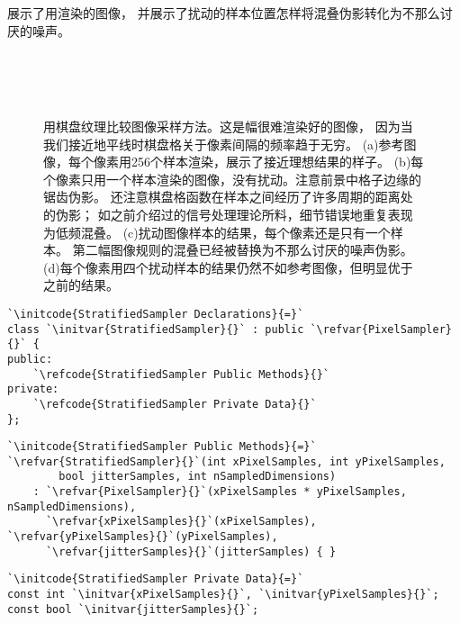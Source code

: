展示了用渲染的图像，
并展示了扰动的样本位置怎样将混叠伪影转化为不那么讨厌的噪声。
\begin{figure}[htbp]
    \centering
    \\
    \\
    \\
    \caption{用棋盘纹理比较图像采样方法。这是幅很难渲染好的图像，
        因为当我们接近地平线时棋盘格关于像素间隔的频率趋于无穷。
        (a)参考图像，每个像素用256个样本渲染，展示了接近理想结果的样子。
        (b)每个像素只用一个样本渲染的图像，没有扰动。注意前景中格子边缘的锯齿伪影。
        还注意棋盘格函数在样本之间经历了许多周期的距离处的伪影；
        如之前介绍过的信号处理理论所料，细节错误地重复表现为低频混叠。
        (c)扰动图像样本的结果，每个像素还是只有一个样本。
        第二幅图像规则的混叠已经被替换为不那么讨厌的噪声伪影。
        (d)每个像素用四个扰动样本的结果仍然不如参考图像，但明显优于之前的结果。}
    \label{fig:7.19}
\end{figure}

\begin{lstlisting}
`\initcode{StratifiedSampler Declarations}{=}`
class `\initvar{StratifiedSampler}{}` : public `\refvar{PixelSampler}{}` {
public:
    `\refcode{StratifiedSampler Public Methods}{}`
private:
    `\refcode{StratifiedSampler Private Data}{}`
};
\end{lstlisting}
\begin{lstlisting}
`\initcode{StratifiedSampler Public Methods}{=}`
`\refvar{StratifiedSampler}{}`(int xPixelSamples, int yPixelSamples,
        bool jitterSamples, int nSampledDimensions)
    : `\refvar{PixelSampler}{}`(xPixelSamples * yPixelSamples, nSampledDimensions),
      `\refvar{xPixelSamples}{}`(xPixelSamples), `\refvar{yPixelSamples}{}`(yPixelSamples),
      `\refvar{jitterSamples}{}`(jitterSamples) { }
\end{lstlisting}
\begin{lstlisting}
`\initcode{StratifiedSampler Private Data}{=}`
const int `\initvar{xPixelSamples}{}`, `\initvar{yPixelSamples}{}`;
const bool `\initvar{jitterSamples}{}`;
\end{lstlisting}

